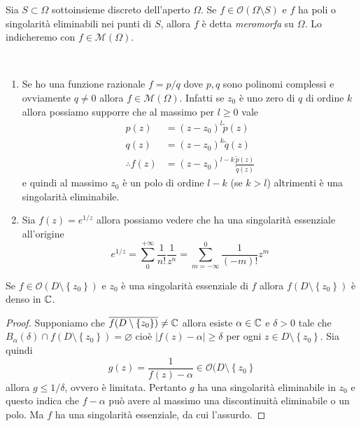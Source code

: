 \begin{definition}
  Sia $S \subset \Omega$ sottoinsieme discreto dell'aperto $\Omega$. Se $f \in
  \mathcal{O}(\Omega \setminus S)$ e $f$ ha poli o singolarità eliminabili nei
  punti di $S$, allora $f$ è detta \emph{meromorfa} su $\Omega$. Lo indicheremo
  con $f \in \mathcal{M}(\Omega)$.
  \label{def:meromorfismo}
\end{definition}

\begin{example}\
  \begin{enumerate}
    \item Se ho una funzione razionale $f= p / q$ dove $p,q$ sono polinomi complessi
      e ovviamente $q \neq 0$ allora $f \in \mathcal{M}(\Omega)$. Infatti se
      $z_0$ è uno zero di $q$ di ordine $k$ allora possiamo supporre che al
      massimo per $l \ge 0$ vale 
      \begin{align*}
       p(z)  & = (z-z_0)^l \tilde{p}(z)  \\
       q(z)  & = (z-z_0)^k \tilde{q}(z) \\
       \therefore f(z)  & = (z-z_0)^{l-k}\frac{\tilde{p}(z)}{\tilde{q}(z)}
      \end{align*}
      e quindi al massimo $z_0$ è un polo di ordine $l-k$ (se $k > l$)
      altrimenti è una singolarità eliminabile. 
    \item Sia $f(z) = e^{1/z}$ allora possiamo vedere che ha una singolarità
      essenziale all'origine
      \begin{equation*}
        e^{1/z} = \sum_{0}^{+\infty} \frac{1}{n!}\frac{1}{z^n} = \sum_{m
        = -\infty}^{0} \frac{1}{(-m)!} z^m 
      \end{equation*}
  \end{enumerate}
\end{example}

\begin{theorem}
    Se $f \in \mathcal{O}(D \setminus \left\{z_0  \right\})$ e $z_0$ è una
    singolarità essenziale di $f$ allora $f(D \setminus \left\{ z_0 \right\})$
    è denso in $\mathbb{C}$.
  \label{thr:casorati_weierstrass}
\end{theorem}
\begin{proof}
  Supponiamo che $\overline{f(D \setminus \left\{ z_0 \right\})} \neq \mathbb{C}$ allora
  esiste $\alpha \in \mathbb{C}$ e $\delta > 0$ tale che $B_{\alpha}(\delta) \cap f(D
  \setminus \left\{ z_0 \right\}) = \varnothing$ cioè $|f(z) - \alpha| \ge
  \delta$ per ogni $z \in D \setminus \left\{ z_0 \right\}$. Sia quindi
  \begin{equation*}
    g(z) = \frac{1}{f(z) - \alpha} \in \mathcal{O}(D \setminus \left\{ z_0
      \right\}
  \end{equation*}
  allora $g \le 1/\delta$, ovvero è limitata. Pertanto $g$ ha una singolarità
  eliminabile in $z_0$ e questo indica che $f - \alpha$ può avere al massimo una
  discontinuità eliminabile o un polo. Ma $f$ ha una singolarità essenziale, da
  cui l'assurdo.
\end{proof}



